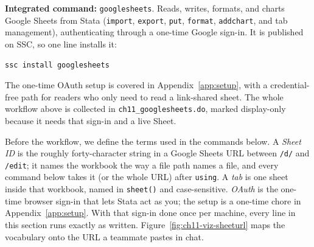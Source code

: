 \begin{kaobox}[frametitle=Package Integration: \texttt{googlesheets}]
\textbf{Integrated command:} \texttt{googlesheets}. Reads, writes, formats, and charts Google Sheets from Stata (\texttt{import}, \texttt{export}, \texttt{put}, \texttt{format}, \texttt{addchart}, and tab management), authenticating through a one-time Google sign-in. It is published on SSC, so one line installs it:
\par
{\footnotesize
\begin{verbatim}
ssc install googlesheets
\end{verbatim}
}
The one-time OAuth setup is covered in Appendix~\ref{app:setup}, with a credential-free path for readers who only need to read a link-shared sheet. The whole workflow above is collected in \texttt{ch11\_googlesheets.do}, marked display-only because it needs that sign-in and a live Sheet.
\end{kaobox}

Before the workflow, we define the terms used in the commands below. A \emph{Sheet ID} is the roughly forty-character string in a Google Sheets URL between \texttt{/d/} and \texttt{/edit}; it names the workbook the way a file path names a file, and every command below takes it (or the whole URL) after \texttt{using}. A \emph{tab} is one sheet inside that workbook, named in \texttt{sheet()} and case-sensitive. \emph{OAuth} is the one-time browser sign-in that lets Stata act as you; the setup is a one-time chore in Appendix~\ref{app:setup}. With that sign-in done once per machine, every line in this section runs exactly as written. Figure~\ref{fig:ch11-viz-sheeturl} maps the vocabulary onto the URL a teammate pastes in chat.

